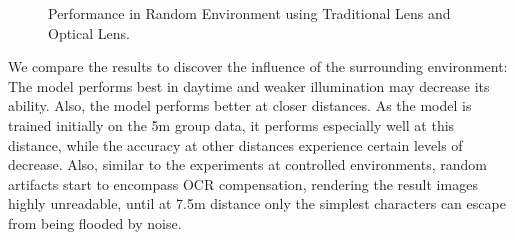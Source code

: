 \begin{figure}[!t]
    \centering
    \hfill
    \caption{Performance in Random Environment using Traditional Lens and Optical Lens.}
    \label{fig:control}
\end{figure}

We compare the results to discover the influence of the surrounding environment: The model performs best in daytime and weaker illumination may decrease its ability. Also, the model performs better at closer distances. As the model is trained initially on the 5m group data, it performs especially well at this distance, while the accuracy at other distances experience certain levels of decrease. Also, similar to the experiments at controlled environments, random artifacts start to encompass OCR compensation, rendering the result images highly unreadable, until at 7.5m distance only the simplest characters can escape from being flooded by noise.



